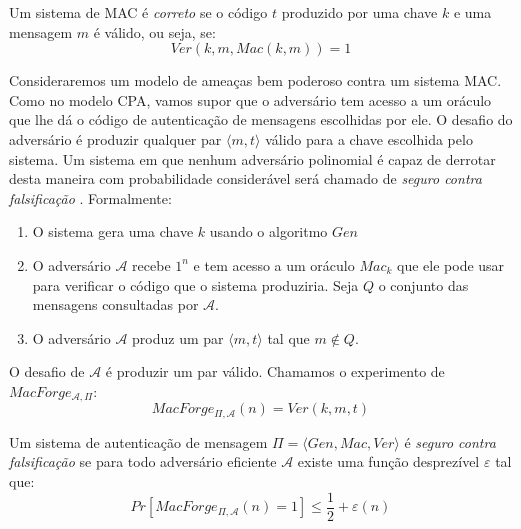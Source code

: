 Um sistema de MAC é {\em correto} se o código $t$ produzido por uma chave $k$ e uma mensagem $m$ é válido, ou seja, se:
\begin{displaymath}
  Ver(k, m, Mac(k,m)) = 1
\end{displaymath}

Consideraremos um modelo de ameaças bem poderoso contra um sistema MAC.
Como no modelo CPA, vamos supor que o adversário tem acesso a um oráculo que lhe dá o código de autenticação de mensagens escolhidas por ele.
O desafio do adversário é produzir qualquer par $\langle m, t \rangle$ válido para a chave escolhida pelo sistema.
Um sistema em que nenhum adversário polinomial é capaz de derrotar desta maneira com probabilidade considerável será chamado de {\em seguro contra falsificação} \cite{Bellare00}.
Formalmente:
\begin{enumerate}
\item O sistema gera uma chave $k$ usando o algoritmo $Gen$
\item O adversário $\mathcal{A}$ recebe $1^n$ e tem acesso a um oráculo $Mac_k$ que ele pode usar para verificar o código que o sistema produziria. Seja $Q$ o conjunto das mensagens consultadas por $\mathcal{A}$.
\item O adversário $\mathcal{A}$ produz um par $\langle m, t \rangle$ tal que $m \notin Q$.
\end{enumerate}

\begin{center}
\end{center}

O desafio de $\mathcal{A}$ é produzir um par válido.
Chamamos o experimento de $MacForge_{\mathcal{A}, \Pi}$:
\begin{displaymath}
  MacForge_{\Pi, \mathcal{A}}(n) = Ver(k, m, t)
\end{displaymath}

Um sistema de autenticação de mensagem $\Pi = \langle Gen, Mac, Ver \rangle$ é {\em seguro contra falsificação} se para todo adversário eficiente $\mathcal{A}$ existe uma função desprezível $\varepsilon$ tal que:
\begin{displaymath}
  Pr[MacForge_{\Pi, \mathcal{A}}(n) = 1] \leq \frac{1}{2} + \varepsilon(n)
\end{displaymath}

